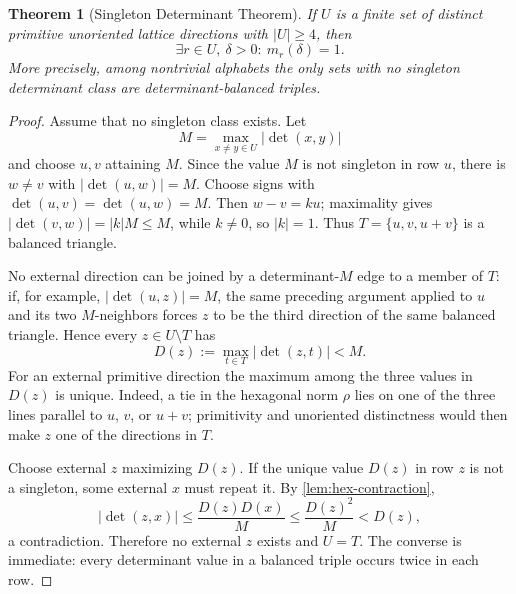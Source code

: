 \documentclass[11pt]{article}
\newtheorem{theorem}{Theorem}[section]
\theoremstyle{definition}
\begin{document}
\begin{theorem}[Singleton Determinant Theorem]\label{thm:singleton}
If $U$ is a finite set of distinct primitive unoriented lattice directions with $|U|\ge4$, then
\[
\boxed{\exists r\in U,\ \delta>0:\ m_r(\delta)=1.}
\]
More precisely, among nontrivial alphabets the only sets with no singleton determinant class are determinant-balanced triples.
\end{theorem}
\begin{proof}
Assume that no singleton class exists.  Let
\[
M=\max_{x\ne y\in U}|\det(x,y)|
\]
and choose $u,v$ attaining $M$.  Since the value $M$ is not singleton in row $u$, there is $w\ne v$ with $|\det(u,w)|=M$.  Choose signs with $\det(u,v)=\det(u,w)=M$.  Then $w-v=ku$; maximality gives $|\det(v,w)|=|k|M\le M$, while $k\ne0$, so $|k|=1$.  Thus $T=\{u,v,u+v\}$ is a balanced triangle.

No external direction can be joined by a determinant-$M$ edge to a member of $T$: if, for example, $|\det(u,z)|=M$, the same preceding argument applied to $u$ and its two $M$-neighbors forces $z$ to be the third direction of the same balanced triangle.  Hence every $z\in U\setminus T$ has
\[
D(z):=\max_{t\in T}|\det(z,t)|<M.
\]
For an external primitive direction the maximum among the three values in $D(z)$ is unique.  Indeed, a tie in the hexagonal norm $\rho$ lies on one of the three lines parallel to $u$, $v$, or $u+v$; primitivity and unoriented distinctness would then make $z$ one of the directions in $T$.

Choose external $z$ maximizing $D(z)$.  If the unique value $D(z)$ in row $z$ is not a singleton, some external $x$ must repeat it.  By \cref{lem:hex-contraction},
\[
|\det(z,x)|\le\frac{D(z)D(x)}{M}\le\frac{D(z)^2}{M}<D(z),
\]
a contradiction.  Therefore no external $z$ exists and $U=T$.  The converse is immediate: every determinant value in a balanced triple occurs twice in each row.
\end{proof}
\end{document}
